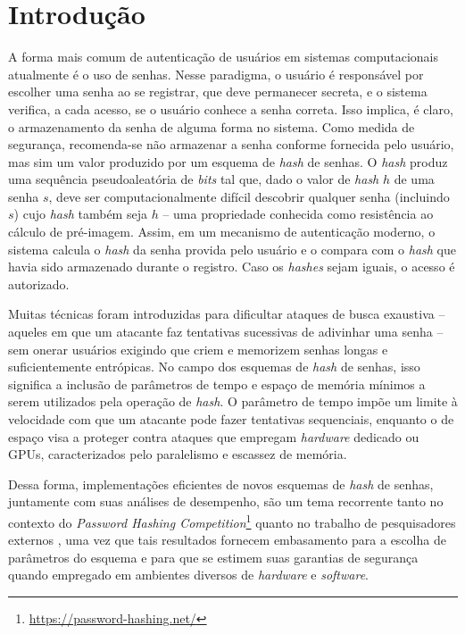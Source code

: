 \documentclass{article}
\begin{document}
\section{Introdução}

A forma mais comum de autenticação de usuários em sistemas
computacionais atualmente é o uso de senhas. Nesse paradigma, o usuário
é responsável por escolher uma senha ao se registrar, que deve
permanecer secreta, e o sistema verifica, a cada acesso, se o usuário
conhece a senha correta. Isso implica, é claro, o armazenamento da senha
de alguma forma no sistema.
%
Como medida de segurança, recomenda-se não armazenar a senha conforme
fornecida pelo usuário, mas sim um valor produzido por um esquema
de \emph{hash} de senhas. O \emph{hash} produz uma sequência pseudoaleatória
de \emph{bits} tal que, dado o valor de \emph{hash} $h$ de uma senha
$s$, deve ser computacionalmente difícil descobrir qualquer senha
(incluindo $s$) cujo \emph{hash} também seja $h$ -- uma propriedade
conhecida como resistência ao cálculo de pré-imagem.
Assim, em um mecanismo de autenticação moderno, o sistema calcula o
\emph{hash} da senha provida pelo usuário e o compara com o \emph{hash}
que havia sido armazenado durante o registro. Caso os
\emph{hashes} sejam iguais, o acesso é autorizado.

Muitas técnicas foram introduzidas para dificultar
ataques de busca exaustiva -- aqueles em que um atacante faz tentativas
sucessivas de adivinhar uma senha -- sem onerar usuários exigindo que
criem e memorizem senhas longas e suficientemente entrópicas.
No campo dos esquemas de \emph{hash} de senhas, isso significa a inclusão
de parâmetros de tempo e espaço de memória mínimos a serem utilizados
pela operação de \emph{hash}. O parâmetro de tempo impõe um limite à
velocidade com que um atacante pode fazer tentativas sequenciais,
enquanto o de espaço visa a proteger contra ataques que empregam \emph{hardware}
dedicado ou GPUs, caracterizados pelo paralelismo e escassez de memória.

Dessa forma, implementações eficientes de novos esquemas de \emph{hash} de
senhas, juntamente com suas análises de desempenho, são um tema recorrente
tanto no contexto do \emph{Password Hashing Competition}\footnote{\url{https://password-hashing.net/}}
\cite{cryptoeprint:2015:678} quanto no trabalho de pesquisadores externos
\cite{chang2015performance}, uma vez que tais resultados fornecem embasamento
para a escolha de parâmetros do esquema e para que se estimem suas garantias de
segurança quando empregado em ambientes diversos de \emph{hardware} e
\emph{software}.
\end{document}
